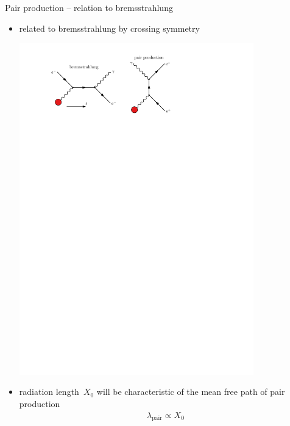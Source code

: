 \documentclass[11pt,xcolor=dvipsnames,professionalfonts]{beamer}
\begin{document}
\begin{frame}{Pair production -- relation to bremsstrahlung}
	\begin{itemize}
		\setlength\itemsep{1.5em}
		\item related to bremsstrahlung by crossing symmetry
		
		\begin{center}
			\vspace{0.3cm}
			\includegraphics[width=0.8\textwidth]{./figures/crossing_symmetry.pdf}
		\end{center}
		
		\item radiation length~$X_0$ will be characteristic of the mean free path of pair production
		\begin{align*}
			\lambda_\mathrm{pair} \propto X_0
		\end{align*}
	\end{itemize}
\end{frame}
\end{document}
